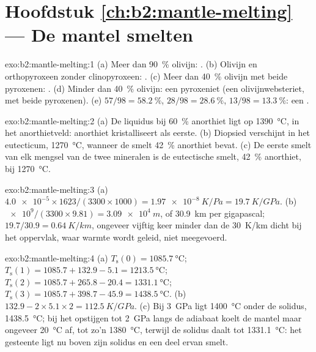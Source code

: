 \section*{Hoofdstuk \ref{ch:b2:mantle-melting} --- De mantel smelten}

\begin{solution}{exo:b2:mantle-melting:1}
(a) Meer dan \qty{90}{\percent} olivijn: . (b) Olivijn en orthopyroxeen
zonder clinopyroxeen: . (c) Meer dan \qty{40}{\percent} olivijn met
beide pyroxenen: . (d) Minder dan \qty{40}{\percent} olivijn: een pyroxeniet
(een olivijnwebsteriet, met beide pyroxenen). (e) $57/98 = \qty{58.2}{\percent}$,
$28/98 = \qty{28.6}{\percent}$, $13/98 = \qty{13.3}{\percent}$: een .
\end{solution}

\begin{solution}{exo:b2:mantle-melting:2}
(a) De liquidus bij \qty{60}{\percent} anorthiet ligt op \qty{1390}{\celsius}, in het
anorthietveld: anorthiet kristalliseert als eerste. (b) Diopsied verschijnt in het
eutecticum, \qty{1270}{\celsius}, wanneer de smelt \qty{42}{\percent} anorthiet bevat.
(c) De eerste smelt van elk mengsel van de twee mineralen is de eutectische smelt,
\qty{42}{\percent} anorthiet, bij \qty{1270}{\celsius}.
\end{solution}

\begin{solution}{exo:b2:mantle-melting:3}
(a) $\num{4.0e-5}\times1623/(3300\times1000) = \qty{1.97e-8}{K/Pa} =
\qty{19.7}{K/GPa}$. (b) $\num{e9}/(3300\times9.81) = \qty{3.09e4}{m}$, of
\qty{30.9}{km} per gigapascal; $19.7/30.9 = \qty{0.64}{K/km}$, ongeveer vijftig keer
minder dan de \qty{30}{K/km} dicht bij het oppervlak, waar warmte wordt geleid, niet
meegevoerd.
\end{solution}

\begin{solution}{exo:b2:mantle-melting:4}
(a) $T_{\mathrm s}(0) = \qty{1085.7}{\celsius}$; $T_{\mathrm s}(1) = 1085.7 +
132.9 - 5.1 = \qty{1213.5}{\celsius}$; $T_{\mathrm s}(2) = 1085.7 + 265.8 - 20.4 =
\qty{1331.1}{\celsius}$; $T_{\mathrm s}(3) = 1085.7 + 398.7 - 45.9 =
\qty{1438.5}{\celsius}$. (b) $132.9 - 2\times5.1\times2 = \qty{112.5}{K/GPa}$.
(c) Bij \qty{3}{GPa} ligt \qty{1400}{\celsius} onder de solidus,
\qty{1438.5}{\celsius}; bij het opstijgen tot \qty{2}{GPa} langs de adiabaat koelt de mantel maar
ongeveer \qty{20}{\celsius} af, tot zo'n \qty{1380}{\celsius}, terwijl de solidus daalt tot
\qty{1331.1}{\celsius}: het gesteente ligt nu boven zijn solidus en een deel ervan smelt.
\end{solution}

